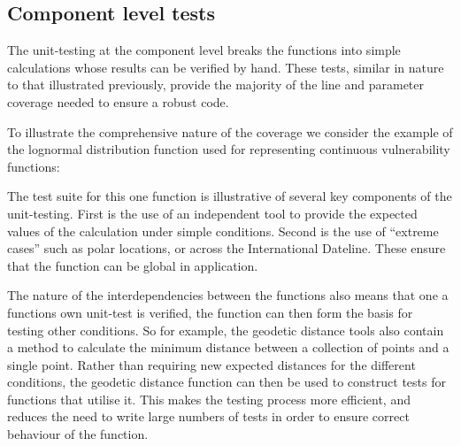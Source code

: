 \subsection{Component level tests}
The unit-testing at the component level breaks the functions into simple
calculations whose results can be verified by hand. These tests, similar in nature to that illustrated previously, provide the majority of the line and parameter coverage needed to ensure a robust code.

To illustrate the comprehensive nature of the coverage we consider the example of the lognormal distribution function used for representing continuous vulnerability functions:


%
The test suite for this one function is illustrative of several key components of the unit-testing. First is the use of an independent tool to provide the expected values of the calculation under simple conditions. Second is the use of ``extreme cases'' such as polar locations, or across the International Dateline. These ensure that the function can be global in application.

The nature of the interdependencies between the functions also means that one a functions own unit-test is verified, the function can then form the basis for testing other conditions. So for example, the geodetic distance tools also contain a method to calculate the minimum distance between a collection of points and a single point. Rather than requiring new expected distances for the different conditions, the geodetic distance function can then be used to construct tests for functions that utilise it. This makes the testing process more efficient, and reduces the need to write large numbers of tests in order to ensure correct behaviour of the function.